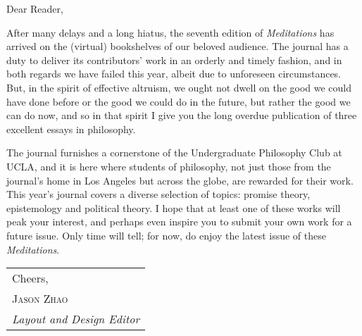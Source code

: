 \noindent Dear Reader,
\bigbreak

After many delays and a long hiatus, the seventh edition of \textit{Meditations} has arrived on the (virtual) bookshelves of our beloved audience. The journal has a duty to deliver its contributors' work in an orderly and timely fashion, and in both regards we have failed this year, albeit due to unforeseen circumstances. But, in the spirit of effective altruism, we ought not dwell on the good we could have done before or the good we could do in the future, but rather the good we can do now, and so in that spirit I give you the long overdue publication of three excellent essays in philosophy.

The journal furnishes a cornerstone of the Undergraduate Philosophy Club at UCLA, and it is here where students of philosophy, not just those from the journal's home in Los Angeles but across the globe, are rewarded for their work. This year's journal covers a diverse selection of topics: promise theory, epistemology and political theory. I hope that at least one of these works will peak your interest, and perhaps even inspire you to submit your own work for a future issue. Only time will tell; for now, do enjoy the latest issue of these \emph{Meditations}.

\bigbreak
\hfill
\begin{tabular}{@{}l@{}}
	Cheers,	\\
	\scshape Jason Zhao \\
	\textit{Layout and Design Editor}
\end{tabular}